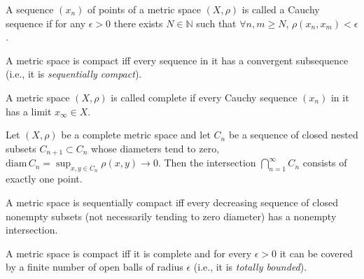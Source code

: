 \begin{defn}
A sequence $(x_n)$ of points of a metric space $(X,\rho)$ is called a Cauchy sequence if for any $\epsilon>0$ there exists $N\in\mathbb{N}$ such that $\forall n,m\geq N$, $\rho(x_n,x_m)<\epsilon$.
\end{defn}

\begin{prop}
    A metric space is compact iff every sequence in it has a convergent subsequence (i.e., it is \emph{sequentially compact}).
\end{prop}

\begin{defn}[Completeness]
A metric space $(X,\rho)$ is called complete if every Cauchy sequence $(x_n)$ in it has a limit $x_\infty\in X$.
\end{defn}


\begin{thm}
Let $(X,\rho)$ be a complete metric space and let $C_n$ be a sequence of closed nested subsets $C_{n+1}\subset C_n$ whose diameters tend to zero, $\mathrm{diam}\,C_n=\sup_{x,y\in C_n} \rho(x,y) \to 0$. Then the intersection $\bigcap_{n=1}^\infty C_n$ consists of exactly one point.
\end{thm}


\begin{prop}
    A metric space is sequentially compact iff every decreasing sequence of closed nonempty subsets (not necessarily tending to zero diameter) has a nonempty intersection.
\end{prop}


\begin{thm}
    A metric space is compact iff it is complete and for every $\epsilon>0$ it can be covered by a finite number of open balls of radius $\epsilon$ (i.e., it is \emph{totally bounded}).
\end{thm}


